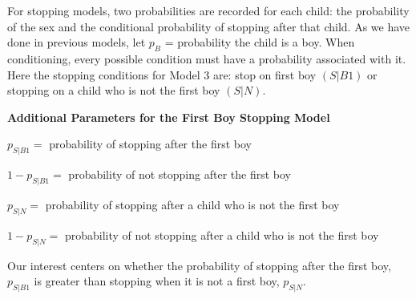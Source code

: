 \documentclass[
]{krantz}
\newcommand{\bstop}{p_{S|B1}}
\newcommand{\nstop}{p_{S|N}}
\renewenvironment{quote}{\begin{VF}}{\end{VF}}
\begin{document}
For stopping models, two probabilities are recorded for each child: the probability of the sex and the conditional probability of stopping after that child. As we have done in previous models, let \(p_B\) = probability the child is a boy. When conditioning, every possible condition must have a probability associated with it. Here the stopping conditions for Model 3 are: stop on first boy \((S|B1)\) or stopping on a child who is not the first boy \((S|N)\).

\textbf{Additional Parameters for the First Boy Stopping Model}

\begin{quote}
\(\bstop =\) probability of stopping after the first boy
\end{quote}

\begin{quote}
\(1 - \bstop=\) probability of not stopping after the first boy
\end{quote}

\begin{quote}
\(\nstop=\) probability of stopping after a child who is not the first boy
\end{quote}

\begin{quote}
\(1 - \nstop=\) probability of not stopping after a child who is not the first boy
\end{quote}

Our interest centers on whether the probability of stopping after the first boy, \(\bstop\) is greater than stopping when it is not a first boy, \(\nstop\).
\end{document}
